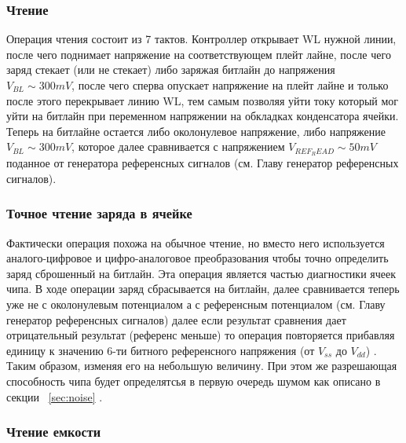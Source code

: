 \documentclass[a4paper,12pt]{article} %
\begin{document}
\subsubsection{Чтение} Операция чтения состоит из 7 тактов. Контроллер открывает WL нужной линии, после чего поднимает напряжение на соответствующем плейт лайне, после чего заряд стекает (или не стекает) либо заряжая битлайн до напряжения  $ V_{BL} \sim 300m  V $, после чего сперва опускает напряжение на плейт лайне и только после этого перекрывает линию WL, тем самым позволяя уйти току который мог уйти на битлайн при переменном напряжении на обкладках конденсатора ячейки. Теперь на битлайне остается либо околонулевое напряжение, либо напряжение $ V_{BL} \sim 300m  V $, которое далее сравнивается с напряжением $ V_{REF_READ} \sim 50m  V $ поданное от генератора референсных сигналов (см. Главу генератор референсных сигналов).
\subsubsection{Точное чтение заряда в ячейке}
\label{subsec:v_scan}
 Фактически операция похожа на обычное чтение, но вместо него используется аналого-цифровое и цифро-аналоговое преобразования чтобы точно определить заряд сброшенный на битлайн. Эта операция является частью диагностики ячеек чипа. В ходе операции заряд сбрасывается на битлайн, далее сравнивается теперь уже не с околонулевым потенциалом а с референсным потенциалом (см. Главу генератор референсных сигналов) далее если результат сравнения дает отрицательный результат (референс меньше) то операция повторяется прибавляя единицу к значению 6-ти битного референсного напряжения (от $ V_{ss}$ до $V_{dd} $) . Таким образом, изменяя его на небольшую величину. При этом же разрешающая способность чипа будет определятсья в первую очередь шумом как описано в секции ~\ref{sec:noise} .
\subsubsection{Чтение емкости}
\end{document}
